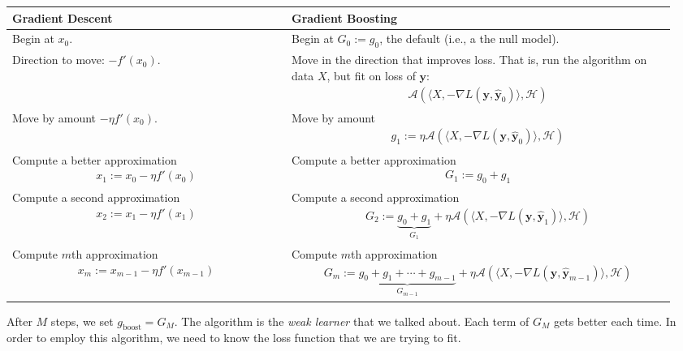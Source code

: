 \documentclass[12pt, a4paper]{article}
\theoremstyle{definition}
\begin{document}
	\begin{center}
		\begin{tabular}{|p{0.4\linewidth}|p{0.55\linewidth}|}
			\hline
			\textbf{Gradient Descent} & \textbf{Gradient Boosting}\\
			\hline
			Begin at $x_0$. &
			Begin at $G_0 := g_0$, the default (i.e., a the null model).\\
			\hline
			Direction to move: $-f'(x_0)$. &
			Move in the direction that improves loss. That is,
			run the algorithm on data $X$, but fit on loss of $\bm{y}$:
			\begin{align*}
				\mathcal{A}(\langle X, -\nabla L(\bm{y}, \hat{\bm{y}}_0) \rangle, \mathcal{H})
			\end{align*}\\
			\hline
			Move by amount $-\eta f'(x_0)$. &
			Move by amount
			\begin{align*}
				g_1 := \eta \mathcal{A}(\langle X, -\nabla L(\bm{y}, \hat{\bm{y}}_0)\rangle, \mathcal{H})
			\end{align*}\\
			\hline
			Compute a better approximation
			\begin{align*}
				x_1 := x_0 - \eta f'(x_0)
			\end{align*} &
			Compute a better approximation
			\begin{align*}
				G_1 := g_0 + g_1
			\end{align*}\\
			\hline
			Compute a second approximation
			\begin{align*}
				x_2 := x_1 - \eta f'(x_1)
			\end{align*} &
			Compute a second approximation
			\begin{align*}
				G_2 := \underbrace{g_0 + g_1}_{G_1} + \eta
				\mathcal{A}(\langle X, -\nabla L(\bm{y}, \hat{\bm{y}}_1)\rangle, \mathcal{H})
			\end{align*}\\
			\hline
			Compute $m$th approximation
			\begin{align*}
				x_m := x_{m-1} - \eta f'(x_{m-1})
			\end{align*} &
			Compute $m$th approximation
			\begin{align*}
				G_m := \underbrace{g_0 + g_1 + \cdots + g_{m-1}}_{G_{m-1}} + \eta
				\mathcal{A}(\langle X, -\nabla L(\bm{y}, \hat{\bm{y}}_{m-1})\rangle, \mathcal{H})
			\end{align*}\\
			\hline
		\end{tabular}
	\end{center}
	After $M$ steps, we set $g_{\text{boost}} = G_M$. The algorithm is the
	\textit{weak learner} that we talked about. Each term of $G_M$ gets better
	each time. In order to employ this algorithm, we need to know the loss function
	that we are trying to fit.
\end{document}
